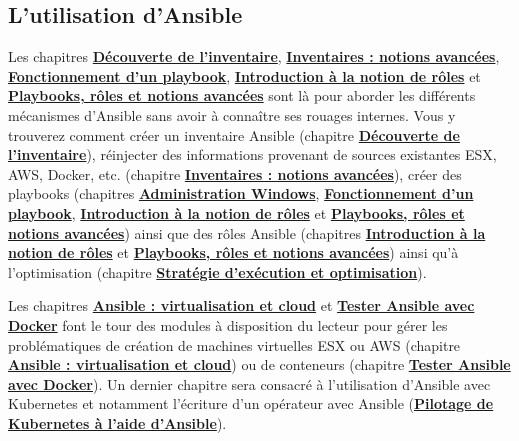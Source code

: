 \documentclass[hidelinks]{article}
\begin{document}
\subsection{L'utilisation d'Ansible}
Les chapitres \hyperref[sec:Découverte de l'inventaire]{\textbf{Découverte de l'inventaire}}, \hyperref[sec:Inventaires-notions avancées]{\textbf{Inventaires : notions avancées}}, \hyperref[sec:Fonctionnement d'un playbook]{\textbf{Fonctionnement d'un playbook}}, \hyperref[sec:Introduction à la notion de rôles]{\textbf{Introduction à la notion de rôles}} et \hyperref[sec:Playbooks, rôles et notions avancées]{\textbf{Playbooks, rôles et notions avancées}} sont là pour aborder les différents mécanismes d'Ansible sans avoir à connaître ses rouages internes. Vous y trouverez comment créer un inventaire Ansible (chapitre \hyperref[sec:Découverte de l'inventaire]{\textbf{Découverte de l'inventaire}}), réinjecter des informations provenant de sources existantes ESX, AWS, Docker, etc. (chapitre \hyperref[sec:Inventaires-notions avancées]{\textbf{Inventaires : notions avancées}}), créer des playbooks (chapitres \hyperref[sec:Administration Windows]{\textbf{Administration Windows}}, \hyperref[sec:Fonctionnement d'un playbook]{\textbf{Fonctionnement d'un playbook}}, \hyperref[sec:Introduction à la notion de rôles]{\textbf{Introduction à la notion de rôles}} et \hyperref[sec:Playbooks, rôles et notions avancées]{\textbf{Playbooks, rôles et notions avancées}}) ainsi que des rôles Ansible (chapitres \hyperref[sec:Introduction à la notion de rôles]{\textbf{Introduction à la notion de rôles}} et \hyperref[sec:Playbooks, rôles et notions avancées]{\textbf{Playbooks, rôles et notions avancées}}) ainsi qu'à l'optimisation (chapitre \hyperref[sec:Stratégie d'exécution et optimisation]{\textbf{Stratégie d'exécution et optimisation}}).

Les chapitres \hyperref[sec:Ansible - virtualisation et cloud]{\textbf{Ansible : virtualisation et cloud}} et \hyperref[sec:Tester Ansible avec docker]{\textbf{Tester Ansible avec Docker}} font le tour des modules à disposition du lecteur pour gérer les problématiques de création de machines virtuelles ESX ou AWS (chapitre \hyperref[sec:Ansible - virtualisation et cloud]{\textbf{Ansible : virtualisation et cloud}}) ou de conteneurs (chapitre \hyperref[sec:Tester Ansible avec docker]{\textbf{Tester Ansible avec Docker}}). Un dernier chapitre sera consacré à l'utilisation d'Ansible avec Kubernetes et notamment l'écriture d'un opérateur avec Ansible (\hyperref[sec:Pilotage de k8s à l'aide d'ansible]{\textbf{Pilotage de Kubernetes à l'aide d'Ansible}}).
\end{document}
